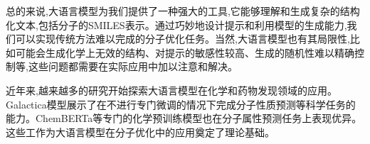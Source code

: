 总的来说,大语言模型为我们提供了一种强大的工具,它能够理解和生成复杂的结构化文本,包括分子的SMILES表示。通过巧妙地设计提示和利用模型的生成能力,我们可以实现传统方法难以完成的分子优化任务。当然,大语言模型也有其局限性,比如可能会生成化学上无效的结构、对提示的敏感性较高、生成的随机性难以精确控制等,这些问题都需要在实际应用中加以注意和解决。

近年来,越来越多的研究开始探索大语言模型在化学和药物发现领域的应用。Galactica模型展示了在不进行专门微调的情况下完成分子性质预测等科学任务的能力\cite{taylor2022galactica}。ChemBERTa等专门的化学预训练模型也在分子属性预测任务上表现优异\cite{chithrananda2020chemberta}。这些工作为大语言模型在分子优化中的应用奠定了理论基础。
